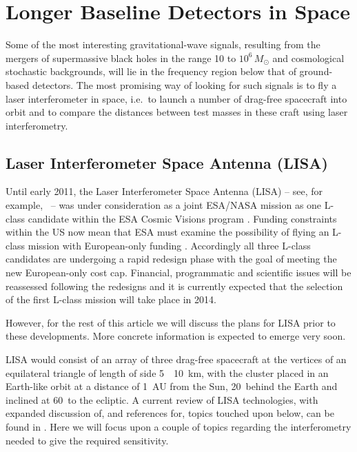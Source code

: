 \documentclass{article}
\begin{document}

\newpage

\section{Longer Baseline Detectors in Space}
\label{section:space}

Some of the most interesting gravitational-wave signals, resulting from the
mergers of supermassive black holes in the range 10 to
$10^{6}\,M_{\odot}$ and cosmological stochastic backgrounds, will lie
in the frequency region below that of ground-based detectors. The most
promising way of looking for such signals is to fly a laser
interferometer in space, i.e.\, to launch a number of drag-free
spacecraft into orbit and to compare the distances between test masses
in these craft using laser interferometry.


\subsection{Laser Interferometer Space Antenna (LISA)}

Until early 2011, the Laser Interferometer Space Antenna (LISA) -- see,
for example,~\cite{LISA, LISAsymposium, NASAweb, ESAweb} --  was under
consideration as a joint ESA/NASA mission as one L-class candidate
within the ESA Cosmic Visions program \cite{ESACosmicVisions}. Funding
constraints within the US now mean that ESA must examine the
possibility of flying an L-class mission with European-only funding
\cite{LISAESAstatement}. Accordingly all three L-class candidates are
undergoing a rapid redesign phase with the goal of meeting the new
European-only cost cap. Financial, programmatic and scientific issues
will be reassessed following the redesigns and it is currently
expected that the selection of the first L-class mission will take place in 2014.

However, for the rest of this article we will discuss the plans for LISA prior
to these developments. More concrete information is expected to emerge very
soon. 

LISA would consist of an array of three drag-free spacecraft at the vertices of
an equilateral triangle of length of side 5~\texttimes~10~km, with the cluster
placed in an Earth-like orbit at a distance of 1~AU from the Sun, 20\textdegree\
behind the Earth and inclined at 60\textdegree\ to the ecliptic. A current review
of LISA technologies, with expanded discussion of, and references for, topics
touched upon below, can be found in \cite{Jennrich:2009}. Here we will focus
upon a couple of topics regarding the interferometry needed to give the required
sensitivity.
\end{document}

